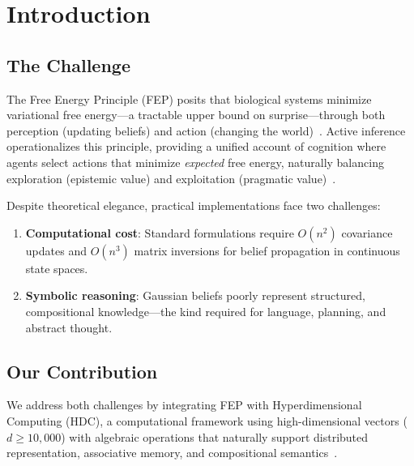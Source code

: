 \documentclass[10pt,letterpaper]{article}
\begin{document}

\section{Introduction}

\subsection{The Challenge}

The Free Energy Principle (FEP) posits that biological systems minimize variational free energy---a tractable upper bound on surprise---through both perception (updating beliefs) and action (changing the world)~\cite{friston2010free}.
Active inference operationalizes this principle, providing a unified account of cognition where agents select actions that minimize \emph{expected} free energy, naturally balancing exploration (epistemic value) and exploitation (pragmatic value)~\cite{friston2017active}.

Despite theoretical elegance, practical implementations face two challenges:
\begin{enumerate}[nosep]
  \item \textbf{Computational cost}: Standard formulations require $O(n^2)$ covariance updates and $O(n^3)$ matrix inversions for belief propagation in continuous state spaces.
  \item \textbf{Symbolic reasoning}: Gaussian beliefs poorly represent structured, compositional knowledge---the kind required for language, planning, and abstract thought.
\end{enumerate}

\subsection{Our Contribution}

We address both challenges by integrating FEP with Hyperdimensional Computing (HDC), a computational framework using high-dimensional vectors ($d \geq 10{,}000$) with algebraic operations that naturally support distributed representation, associative memory, and compositional semantics~\cite{kanerva2009hyperdimensional}.
\end{document}
